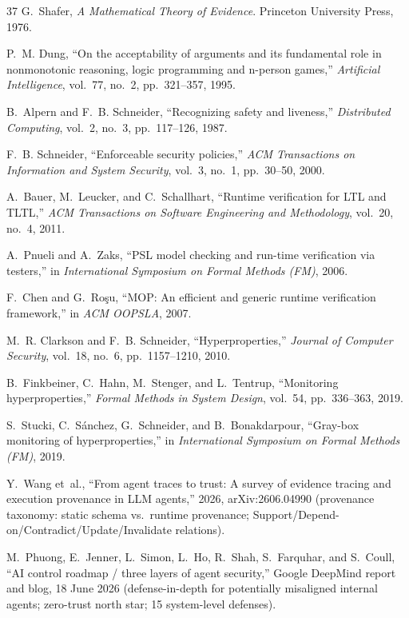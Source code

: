 \documentclass[conference]{IEEEtran}
\begin{document}
\begin{thebibliography}{37}
 G.~Shafer, \emph{A Mathematical Theory of
Evidence}. Princeton University Press, 1976.

 P.~M. Dung, ``On the acceptability of arguments and
its fundamental role in nonmonotonic reasoning, logic programming
and n-person games,'' \emph{Artificial Intelligence}, vol.~77,
no.~2, pp.~321--357, 1995.

 B.~Alpern and F.~B. Schneider, ``Recognizing
safety and liveness,'' \emph{Distributed Computing}, vol.~2,
no.~3, pp.~117--126, 1987.

 F.~B. Schneider, ``Enforceable security
policies,'' \emph{ACM Transactions on Information and System
Security}, vol.~3, no.~1, pp.~30--50, 2000.

 A.~Bauer, M.~Leucker, and C.~Schallhart, ``Runtime
verification for LTL and TLTL,'' \emph{ACM Transactions on
Software Engineering and Methodology}, vol.~20, no.~4, 2011.

 A.~Pnueli and A.~Zaks, ``PSL model checking and
run-time verification via testers,'' in \emph{International
Symposium on Formal Methods (FM)}, 2006.

 F.~Chen and G.~Ro\c{s}u, ``MOP: An efficient and
generic runtime verification framework,'' in \emph{ACM OOPSLA},
2007.

 M.~R. Clarkson and F.~B. Schneider,
``Hyperproperties,'' \emph{Journal of Computer Security},
vol.~18, no.~6, pp.~1157--1210, 2010.

 B.~Finkbeiner, C.~Hahn, M.~Stenger, and
L.~Tentrup, ``Monitoring hyperproperties,'' \emph{Formal Methods
in System Design}, vol.~54, pp.~336--363, 2019.

 S.~Stucki, C.~S\'anchez, G.~Schneider, and
B.~Bonakdarpour, ``Gray-box monitoring of hyperproperties,'' in
\emph{International Symposium on Formal Methods (FM)}, 2019.

 Y.~Wang et~al., ``From agent traces to trust: A
survey of evidence tracing and execution provenance in LLM
agents,'' 2026, arXiv:2606.04990 (provenance taxonomy: static
schema vs.\ runtime provenance;
Support/Depend-on/Contradict/Update/Invalidate relations).

 M.~Phuong, E.~Jenner, L.~Simon, L.~Ho,
R.~Shah, S.~Farquhar, and S.~Coull, ``AI control roadmap / three
layers of agent security,'' Google DeepMind report and blog, 18
June 2026 (defense-in-depth for potentially misaligned internal
agents; zero-trust north star; 15 system-level defenses).


\end{thebibliography}
\end{document}
